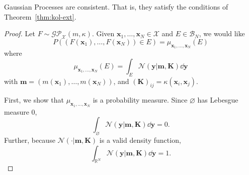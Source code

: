 \begin{theorem}
    \label{thm:gp-const}
    Gaussian Processes are consistent.
    That is, they satisfy the conditions of Theorem~\ref{thm:kol-ext}.
\end{theorem}
\begin{proof}
    Let $F \sim \mathcal{GP}_{ \mathcal{X} }(m, \kappa)$.
    Given $\mathbf{x}_1, \ldots, \mathbf{x}_N \in \mathcal{X}$ and $E \in \mathcal{B}_N$,
    we would like
    \begin{equation*}
        P((F(\mathbf{x}_1), \ldots, F(\mathbf{x}_N)) \in E) = \mu_{\mathbf{x}_1, \dots, \mathbf{x}_N}(E)
    \end{equation*}
    where
    \begin{equation*}
        \mu_{\mathbf{x}_1, \dots, \mathbf{x}_N}(E)
        = \int_{E} \mathcal{N}( \mathbf{y} | \mathbf{m}, \mathbf{K}) \dd \mathbf{y}
    \end{equation*}
    with $\mathbf{m} = (m(\mathbf{x}_1), \dots, m(\mathbf{x}_N))$, and $(\mathbf{K})_{ij} = \kappa(\mathbf{x}_i, \mathbf{x}_j)$.

    First, we show that $\mu_{\mathbf{x}_1, \dots, \mathbf{x}_N}$ is a probability measure.
    Since $\varnothing$ has Lebesgue measure 0,
    \begin{equation*}
        \int_{\varnothing} \mathcal{N}(\mathbf{y} | \mathbf{m}, \mathbf{K}) \dd \mathbf{y} = 0.
    \end{equation*}
    Further, because $\mathcal{N}( \cdot | \mathbf{m}, \mathbf{K})$ is a valid density function,
    \begin{equation*}
        \int_{\mathbb{R}^{N}} \mathcal{N}(\mathbf{y} | \mathbf{m}, \mathbf{K}) \dd \mathbf{y} = 1.
    \end{equation*}


\end{proof}
